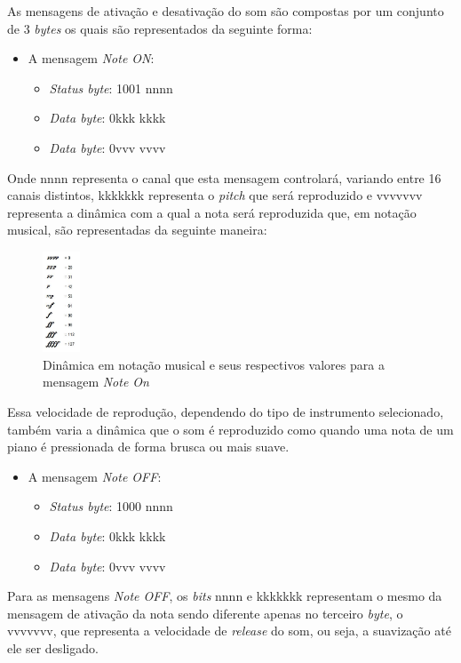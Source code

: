 \documentclass[12pt]{report}
\begin{document}
As mensagens de ativação e desativação do som são compostas por um conjunto de 3 {\it bytes} os quais são representados da seguinte forma:
\begin{itemize}
  \item A mensagem {\it Note ON}:
  \begin{itemize}
    \item {\it Status byte}: 1001 nnnn
    \item {\it Data byte}: 0kkk kkkk
    \item {\it Data byte}: 0vvv vvvv
  \end{itemize}
\end{itemize}

Onde nnnn representa o canal que esta mensagem controlará, variando entre 16 canais distintos, kkkkkkk representa o {\it pitch} que será reproduzido e vvvvvvv representa a dinâmica com a qual a nota será reproduzida que, em notação musical, são representadas da seguinte maneira:

\begin{figure}[H]
  \centering
    \includegraphics[width=0.1\textwidth]{imagens/nuance-velocity-table.jpg}
    \caption{Dinâmica em notação musical e seus respectivos valores para a mensagem {\it Note On}}
  \label{fig:Velocidades em notação musical}
\end{figure}

Essa velocidade de reprodução, dependendo do tipo de instrumento selecionado, também varia a dinâmica que o som é reproduzido como quando uma nota de um piano é pressionada de forma brusca ou mais suave.
\begin{itemize}
  \item A mensagem {\it Note OFF}:
  \begin{itemize}
    \item {\it Status byte}: 1000 nnnn
    \item {\it Data byte}: 0kkk kkkk
    \item {\it Data byte}: 0vvv vvvv
  \end{itemize}
\end{itemize}

Para as mensagens {\it Note OFF}, os {\it bits} nnnn e kkkkkkk representam o mesmo da mensagem de ativação da nota sendo diferente apenas no terceiro {\it byte}, o vvvvvvv, que representa a velocidade de {\it release} do som, ou seja, a suavização até ele ser desligado.
\end{document}
